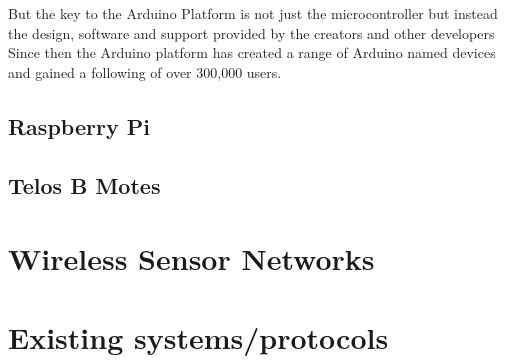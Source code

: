 \documentclass{l4proj}
\begin{document}
But the key to the Arduino Platform is not just the microcontroller but instead the design, software and support provided by the creators and other developers
Since then the Arduino platform has created a range of Arduino named devices and gained a following of over 300,000 users\cite{ArduinoNumbers}. 

\begin{comment}
OPEN SOURCE
Microcontroller, cheap, easy, pic chips were difficult, lowered barrier of entry, provided large support and huge following
italian made, several iterations on size and power
Good starting point for development as there are many in existance
Well adopted
Based on C/C++ with a few tweaks, offers shields for expandability i.e. ethernet, wifi
very good at sensing and doing things
16mhz
no threading
\end{comment}

\subsection{Raspberry Pi} %
\label{sub:raspberry_pi}
\begin{comment}
new, more powerful open device. runs a real operating system with gpio options
perhaps upper limit of power for this protocol
most languages possible, threading etc
\end{comment}

\subsection{Telos B Motes} %
\label{sub:telos_b_motes}
\begin{comment}
popular academic tool, many os's, very low power like arduino, with radio and sensors
some gpio, but limited
contiki c like, event and thread driven
\end{comment}
\section{Wireless Sensor Networks} %
\label{sec:wireless_sensor_networks}


\section{Existing systems/protocols} %
\label{sec:existing_systems_protocols}
\end{document}
